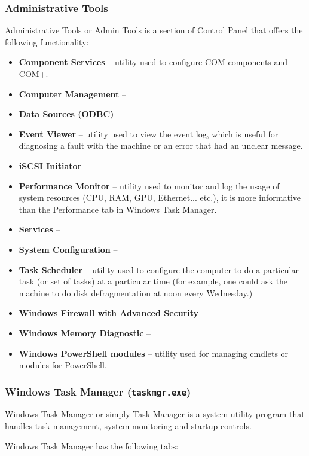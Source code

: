 \documentclass{article}
\begin{document}
\subsubsection{Administrative Tools}

Administrative Tools or Admin Tools is a section of Control Panel that offers the following functionality:

\begin{itemize}
    \item \textbf{Component Services} -- utility used to configure COM components and COM+.
    \item \textbf{Computer Management} --
    \item \textbf{Data Sources (ODBC)} --
    \item \textbf{Event Viewer} -- utility used to view the event log, which is useful for diagnosing a fault with the machine or an error that had an unclear message.
    \item \textbf{iSCSI Initiator} --
    \item \textbf{Performance Monitor} -- utility used to monitor and log the usage of system resources (CPU, RAM, GPU, Ethernet... etc.), it is more informative than the Performance tab in Windows Task Manager.
    \item \textbf{Services} --
    \item \textbf{System Configuration} --
    \item \textbf{Task Scheduler} -- utility used to configure the computer to do a particular task (or set of tasks) at a particular time (for example, one could ask the machine to do disk defragmentation at noon every Wednesday.)
    \item \textbf{Windows Firewall with Advanced Security} --
    \item \textbf{Windows Memory Diagnostic} --
    \item \textbf{Windows PowerShell modules} -- utility used for managing cmdlets or modules for PowerShell.
\end{itemize}

\subsubsection{Windows Task Manager (\texttt{taskmgr.exe})}

Windows Task Manager or simply Task Manager is a system utility program that handles task management, system monitoring and startup controls.

Windows Task Manager has the following tabs:
\end{document}
